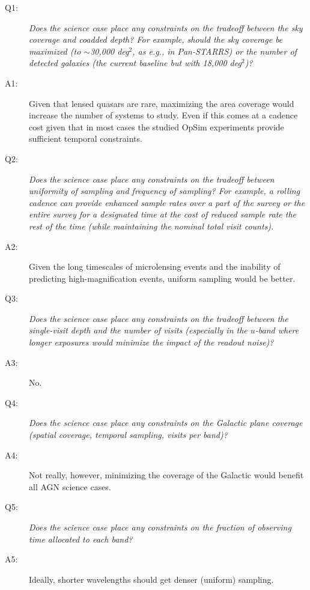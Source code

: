 \begin{description}

\item[Q1:] {\it Does the science case place any constraints on the
tradeoff between the sky coverage and coadded depth? For example, should
the sky coverage be maximized (to $\sim$30,000 deg$^2$, as e.g., in
Pan-STARRS) or the number of detected galaxies (the current baseline but
with 18,000 deg$^2$)?}

\item[A1:] Given that lensed quasars are rare, maximizing the area
coverage would increase the number of systems to study. Even if this
comes at a cadence cost given that in most cases the studied OpSim
experiments provide sufficient temporal constraints.

\item[Q2:] {\it Does the science case place any constraints on the
tradeoff between uniformity of sampling and frequency of  sampling? For
example, a rolling cadence can provide enhanced sample rates over a part
of the survey or the entire survey for a designated time at the cost of
reduced sample rate the rest of the time (while maintaining the nominal
total visit counts).}

\item[A2:] Given the long timescales of microlensing events and the inability of predicting high-magnification events, uniform sampling would be better.

\item[Q3:] {\it Does the science case place any constraints on the
tradeoff between the single-visit depth and the number of visits
(especially in the $u$-band where longer exposures would minimize the
impact of the readout noise)?}

\item[A3:] No.

\item[Q4:] {\it Does the science case place any constraints on the
Galactic plane coverage (spatial coverage, temporal sampling, visits per
band)?}

\item[A4:] Not really, however, minimizing the coverage of the Galactic would benefit all AGN science cases.

\item[Q5:] {\it Does the science case place any constraints on the
fraction of observing time allocated to each band?}

\item[A5:] Ideally, shorter wavelengths should get denser (uniform) sampling.


\end{description}
